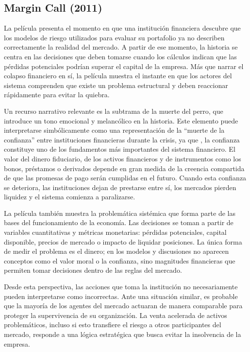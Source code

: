 \subsection{Margin Call (2011)}

La película presenta el momento en que una institución financiera descubre que los modelos de riesgo utilizados para evaluar su portafolio ya no describen correctamente la realidad del mercado. A partir de ese momento, la historia se centra en las decisiones que deben tomarse cuando los cálculos indican que las pérdidas potenciales podrían superar el capital de la empresa. Más que narrar el colapso financiero en sí, la película muestra el instante en que los actores del sistema comprenden que existe un problema estructural y deben reaccionar rápidamente para evitar la quiebra.

Un recurso narrativo relevante es la subtrama de la muerte del perro, que introduce un tono emocional y melancólico en la historia. Este elemento puede interpretarse simbólicamente como una representación de la “muerte de la confianza” entre instituciones financieras durante la crisis, ya que , la confianza constituye uno de los fundamentos más importantes del sistema financiero. El valor del dinero fiduciario, de los activos financieros y de instrumentos como los bonos, préstamos o derivados depende en gran medida de la creencia compartida de que las promesas de pago serán cumplidas en el futuro. Cuando esta confianza se deteriora, las instituciones dejan de prestarse entre sí, los mercados pierden liquidez y el sistema comienza a paralizarse. 

La película también muestra la problemática sistémica que forma parte de las bases del funcionamiento de la economía. Las decisiones se toman a partir de variables cuantitativas y métricas monetarias: pérdidas potenciales, capital disponible, precios de mercado o impacto de liquidar posiciones. La única forma de medir el problema es el dinero; en los modelos y discusiones no aparecen conceptos como el valor moral o la confianza, sino magnitudes financieras que permiten tomar decisiones dentro de las reglas del mercado.

Desde esta perspectiva, las acciones que toma la institución no necesariamente pueden interpretarse como incorrectas. Ante una situación similar, es probable que la mayoría de los agentes del mercado actuaran de manera comparable para proteger la supervivencia de su organización. La venta acelerada de activos problemáticos, incluso si esto transfiere el riesgo a otros participantes del mercado, responde a una lógica estratégica que busca evitar la insolvencia de la empresa.

